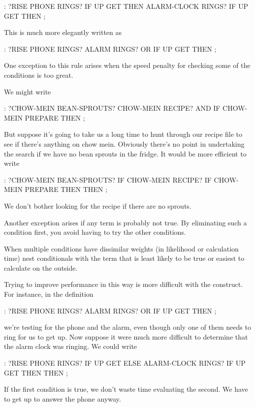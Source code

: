 \begin{Code}
: ?RISE    PHONE RINGS? IF  UP GET  THEN
     ALARM-CLOCK RINGS?  IF UP GET THEN ;
\end{Code}
This is much more elegantly written as

\begin{Code}
: ?RISE  PHONE RINGS?  ALARM RINGS? OR  IF  UP GET THEN ;
\end{Code}
One exception to this rule arises when the speed penalty for checking
some of the conditions is too great.

We might write

\begin{Code}
: ?CHOW-MEIN   BEAN-SPROUTS?  CHOW-MEIN RECIPE?  AND IF
   CHOW-MEIN PREPARE  THEN ;
\end{Code}
But suppose it's going to take us a long time to hunt through our recipe
file to see if there's anything on chow mein. Obviously there's no point in
undertaking the search if we have no bean sprouts in the fridge. It would
be more efficient to write

\begin{Code}
: ?CHOW-MEIN   BEAN-SPROUTS? IF  CHOW-MEIN RECIPE? IF
   CHOW-MEIN PREPARE THEN   THEN ;
\end{Code}
We don't bother looking for the recipe if there are no sprouts.

Another exception arises if any term is probably not true. By
eliminating such a condition first, you avoid having to try the other
conditions.

\begin{tip}
When multiple conditions have dissimilar weights (in likelihood or
calculation time) nest conditionals with the term that is least likely
to be true or easiest to calculate on the outside.
\end{tip}
Trying to improve performance in this way is more difficult with the 
construct. For instance, in the definition

\begin{Code}
: ?RISE  PHONE RINGS?  ALARM RINGS? OR  IF  UP GET THEN ;
\end{Code}
we're testing for the phone and the alarm, even though only one of them
needs to ring for us to get up. Now suppose it were much more difficult to
determine that the alarm clock was ringing. We could write

\begin{Code}
: ?RISE   PHONE RINGS? IF  UP GET  ELSE
     ALARM-CLOCK RINGS?  IF UP GET THEN THEN  ;
\end{Code}
If the first condition is true, we don't waste time evaluating the second.
We have to get up to answer the phone anyway.

